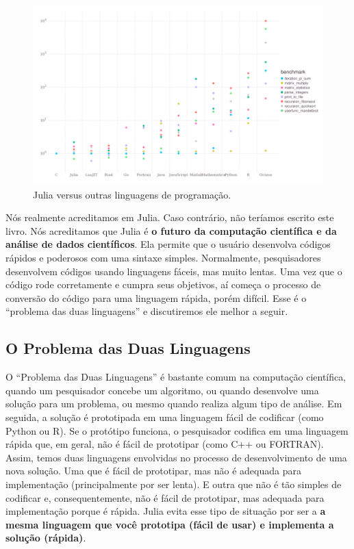 \documentclass[
  notoc %
]{tufte-book}
\begin{document}
\begin{figure}
\hypertarget{fig:benchmarks}{%
\centering
\includegraphics{images/benchmarks.png}
\caption{Julia versus outras linguagens de
programação.}\label{fig:benchmarks}
}
\end{figure}

Nós realmente acreditamos em Julia. Caso contrário, não teríamos escrito
este livro. Nós acreditamos que Julia é \textbf{o futuro da computação
científica e da análise de dados científicos}. Ela permite que o usuário
desenvolva códigos rápidos e poderosos com uma sintaxe simples.
Normalmente, pesquisadores desenvolvem códigos usando linguagens fáceis,
mas muito lentas. Uma vez que o código rode corretamente e cumpra seus
objetivos, aí começa o processo de conversão do código para uma
linguagem rápida, porém difícil. Esse é o ``problema das duas
linguagens'' e discutiremos ele melhor a seguir.

\hypertarget{sec:two_language}{%
\subsection{O Problema das Duas Linguagens}\label{sec:two_language}}

O ``Problema das Duas Linguagens'' é bastante comum na computação
científica, quando um pesquisador concebe um algoritmo, ou quando
desenvolve uma solução para um problema, ou mesmo quando realiza algum
tipo de análise. Em seguida, a solução é prototipada em uma linguagem
fácil de codificar (como Python ou R). Se o protótipo funciona, o
pesquisador codifica em uma linguagem rápida que, em geral, não é fácil
de prototipar (como C++ ou FORTRAN). Assim, temos duas linguagens
envolvidas no processo de desenvolvimento de uma nova solução. Uma que é
fácil de prototipar, mas não é adequada para implementação
(principalmente por ser lenta). E outra que não é tão simples de
codificar e, consequentemente, não é fácil de prototipar, mas adequada
para implementação porque é rápida. Julia evita esse tipo de situação
por ser a \textbf{a mesma linguagem que você prototipa (fácil de usar) e
implementa a solução (rápida)}.
\end{document}
